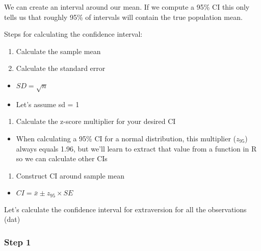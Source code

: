 \documentclass[
]{article}
\newenvironment{Shaded}{\begin{snugshade}}{\end{snugshade}}
\newcommand{\AttributeTok}[1]{\textcolor[rgb]{0.13,0.29,0.53}{#1}}
\newcommand{\ConstantTok}[1]{\textcolor[rgb]{0.56,0.35,0.01}{#1}}
\newcommand{\FunctionTok}[1]{\textcolor[rgb]{0.13,0.29,0.53}{\textbf{#1}}}
\newcommand{\NormalTok}[1]{#1}
\newcommand{\OtherTok}[1]{\textcolor[rgb]{0.56,0.35,0.01}{#1}}
\newcommand{\SpecialCharTok}[1]{\textcolor[rgb]{0.81,0.36,0.00}{\textbf{#1}}}
\providecommand{\tightlist}{%
  \setlength{\itemsep}{0pt}\setlength{\parskip}{0pt}}
\begin{document}
We can create an interval around our mean. If we compute a 95\% CI this
only tells us that roughly 95\% of intervals will contain the true
population mean.

Steps for calculating the confidence interval:

\begin{enumerate}
\def\labelenumi{\arabic{enumi}.}
\tightlist
\item
  Calculate the sample mean
\item
  Calculate the standard error
\end{enumerate}

\begin{itemize}
\tightlist
\item
  \(SD = \sqrt{n}\)
\item
  Let's assume sd = 1
\end{itemize}

\begin{enumerate}
\def\labelenumi{\arabic{enumi}.}
\setcounter{enumi}{2}
\tightlist
\item
  Calculate the z-score multiplier for your desired CI
\end{enumerate}

\begin{itemize}
\tightlist
\item
  When calculating a 95\% CI for a normal distribution, this multiplier
  (\(z_{95}\)) always equals 1.96, but we'll learn to extract that value
  from a function in R so we can calculate other CIs
\end{itemize}

\begin{enumerate}
\def\labelenumi{\arabic{enumi}.}
\setcounter{enumi}{3}
\tightlist
\item
  Construct CI around sample mean
\end{enumerate}

\begin{itemize}
\tightlist
\item
  \(CI =\bar{x} \pm z_{95} \times SE\)
\end{itemize}

Let's calculate the confidence interval for extraversion for all the
observations (dat)

\hypertarget{step-1}{%
\subsubsection{Step 1}\label{step-1}}

\begin{Shaded}
\end{Shaded}
\end{document}
